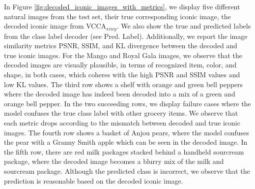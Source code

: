 In Figure \ref{fig:decoded_iconic_images_with_metrics}, we display five different natural images from the test set, their true corresponding iconic image, the decoded iconic image from VCCA$_{x i w y}$. 
We also show the true and predicted labels from the class label decoder (see Pred. Label). 
Additionally, we report the image similarity metrics PSNR, SSIM, and KL divergence between the decoded and true iconic images. For the Mango and Royal Gala images, we observe that the decoded images are visually plausible, in terms of recognized item, color, and shape, in both cases, which coheres with the high PSNR and SSIM values and low KL values.
The third row shows a shelf with orange and green bell peppers where the decoded image has indeed been decoded into a mix of a green and orange bell pepper. In the two succeeding rows, we display failure cases where the model confuses the true class label with other grocery items. We observe that each metric drops according to the mismatch between decoded and true iconic images. The fourth row shows a basket of Anjou pears, where the model confuses the pear with a Granny Smith apple which can be seen in the decoded image. In the fifth row, there are red milk packages stacked behind a handheld sourcream package, where the decoded image becomes a blurry mix of the milk and sourcream package. Although the predicted class is incorrect, we observe that the prediction is reasonable based on the decoded iconic image.




